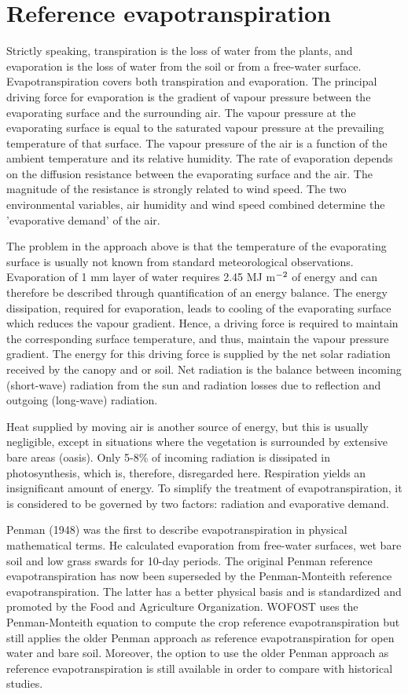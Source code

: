 \section{Reference evapotranspiration}

Strictly speaking, transpiration is the loss of water from the plants, and evaporation is the
loss of water from the soil or from a free-water surface. Evapotranspiration covers both
transpiration and evaporation.
The principal driving force for evaporation is the gradient of vapour pressure between the
evaporating surface and the surrounding air. The vapour pressure at the evaporating
surface is equal to the saturated vapour pressure at the prevailing temperature of that
surface. The vapour pressure of the air is a function of the ambient temperature and its
relative humidity. The rate of evaporation depends on the diffusion resistance between the
evaporating surface and the air.
The magnitude of the resistance is strongly related to wind speed. The two environ\-mental
variables, air humidity and wind speed combined determine the 'evaporative demand' of
the air.

The problem in the approach above is that the temperature of the evaporating surface is
usually not known from standard meteorological observations. Evaporation  of 1 mm
layer of water requires 2.45 MJ m$^{{\rm -2}}$ of energy and can therefore be described through
quantification of an energy balance. The energy dissipation, required for evaporation,
leads to cooling of the evaporating surface which reduces the vapour gradient. Hence, a
driving force is required to maintain the corresponding surface temperature, and thus,
maintain the vapour pres\-sure gradient. The energy for this driving force is supplied by the
net solar radiation received by the canopy and or soil.
Net radiation is the balance between incoming (short-wave) radiation from the sun and
radiation losses due to reflection and outgoing (long-wave) radiation. 

Heat supplied by
moving air is another source of energy, but this is usually negligible, except in situations
where the vegetation is surrounded by extensive bare areas (oasis). Only 5-8\% of
incoming radiation is dissipated in photosynthesis, which is, therefore, disregarded here.
Respiration yields an insignificant amount of energy. To simplify the treatment of
evapotranspiration, it is considered to be governed by two factors: radiation and evaporative demand.

Penman (1948) was the first to describe evapotranspiration in physical mathematical
terms. He calculated evaporation from free-water surfaces, wet bare soil and low grass
swards for 10-day periods. The original Penman reference evapotranspiration has now been 
superseded by the 
Penman-Monteith reference evapotranspiration. The latter has a better physical basis and
is standardized and promoted by the Food and Agriculture Organization. WOFOST uses the
Penman-Monteith equation to compute the crop reference evapotranspiration but still applies
the older Penman approach as reference evapotranspiration for open water and bare soil.
Moreover, the option to use the older Penman approach as reference evapotranspiration is still
available in order to compare with historical studies.

